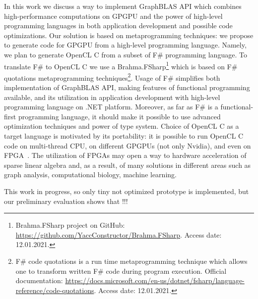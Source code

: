 In this work we discuss a way to implement GraphBLAS API which combines high-performance computations on GPGPU and the power of high-level programming languages in both application development and possible code optimizations.
Our solution is based on metaprogramming techniques: we propose to generate code for GPGPU from a high-level programming language.
Namely, we plan to generate OpenCL C from a subset of  F\# programming language.
To translate F\# to OpenCL C we use a Brahma.FSharp\footnote{Brahma.FSharp project on GitHub: \url{https://github.com/YaccConstructor/Brahma.FSharp}. Access date: 12.01.2021.} which is based on F\# quotations metaprogramming techniques\footnote{F\# code quotations is a run time metaprogramming technique which allows one to transform written F\# code during program execution. Official documentation: \url{https://docs.microsoft.com/en-us/dotnet/fsharp/language-reference/code-quotations}. Access date: 12.01.2021.}.
Usage of F\# simplifies both implementation of GraphBLAS API, making features of functional programming available, and its utilization in application development with high-level programming language on .NET platform. 
Moreover, as far as F\# is a functional-first programming language, it should make it possible to use advanced optimization techniques and power of type system.
Choice of OpenCL C as a target language is motivated by its portability: it is possible to run OpenCL C code on multi-thread CPU, on different GPGPUs (not only Nvidia), and even on FPGA~\cite{kenter2019invited, 6567546}.
The utilization of FPGAs may open a way to hardware acceleration of sparse linear algebra and, as a result, of many solutions in different areas such as graph analysis, computational biology, machine learning.


This work in progress, so only tiny not optimized prototype is implemented, but our preliminary evaluation shows that !!!